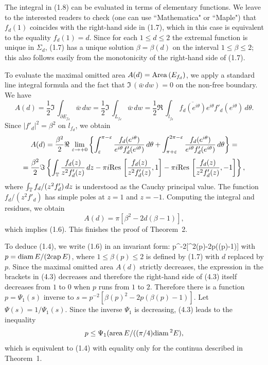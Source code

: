 The integral in (1.8) can be evaluated in terms of elementary functions. We leave to the interested readers to check (one can use ``Mathematica" or ``Maple")
that $f_d(1)$ coincides with the right-hand side in (1.7), which in this case is equivalent to the equality $f_d(1)=d$.
Since for each $1\le d\le 2$ the extremal function is unique in $\Sigma_d$, (1.7) has  a unique solution $\beta=\beta(d)$ on the interval $1\le \beta \le 2$;
this also follows easily from the monotonicity of the right-hand side of (1.7).


\medskip


To evaluate the maximal omitted area ${A(d)=\rm{Area}}\,(E_{f_d})$, we apply a standard line integral formula and
the fact that $\Im\, (\bar w\,dw)=0$ on the non-free boundary. We have
$$
A(d)=\frac12 \Im\,\int_{\partial E_{f_d}}\bar w\, dw=\frac12
\Im\,\int_{L_{f_d}}\bar w\,dw=\frac12 \Re\,\int_{l_{f_d}}
\overline{f_d(e^{i\theta})}e^{i\theta}f'_d(e^{i\theta})\,d\theta.
$$
Since $|f'_d|^2=\beta^2$ on $l_{f_d}$, we obtain 
$$
A(d)=\frac{\beta^2}{2}\Re\,\lim_{\varepsilon\to +0}\left\{\int_{\varepsilon}^{\pi-\varepsilon}
\frac{f_d(e^{i\theta})}{e^{i\theta}f'_d(e^{i\theta})}\,d\theta +\int_{\pi +\varepsilon}^{2\pi-\varepsilon}
\frac{f_d(e^{i\theta})}{e^{i\theta}f'_d(e^{i\theta})}\,d\theta\right\}=
$$
$$
=\frac{ \beta^2}{2} \Im\left\{ \int_{{\Bbb{T}}} \frac{f_d(z)}{z^2f'_d(z)}\,dz-\pi i {\rm{Res}}\,\left[\frac{f_d(z)}{z^2f'_d(z)},1\right]
-\pi i {\rm{Res}}\,\left[\frac{f_d(z)}{z^2f'_d(z)},-1\right]\right\},
$$
where $\int_{{\Bbb{T}}}f_d/(z^2f'_d) \,dz$ is understood as the Cauchy principal value. 
The function $f_d/(z^2f'_d)$ has simple poles at $z=1$ and $z=-1$.
Computing the integral and residues, we obtain 
$$
A(d)=\pi[\beta^2-2d(\beta-1)],
$$
which implies (1.6). This finishes the proof of Theorem~2.

\medskip

To deduce (1.4), we write (1.6) in an invariant form:
\be
{}\le p^{-2}[\beta^2(p)-2p(\beta(p)-1)]
\ee
with $p={\rm diam}\, E/(2{\rm cap}\, E)$, where $1\le \beta(p)\le 2$ is defined by  (1.7) with $d$ replaced by $p$.
Since the maximal omitted area $A(d)$ strictly decreases, the expression in the brackets in (4.3) decreases and therefore the right-hand side 
of (4.3) itself decreases from $1$ to $0$ when $p$ runs from $1$ to $2$. Therefore there is a function $p=\Psi_1(s)$ inverse to 
$s=p^{-2}[\beta(p)^2-2p(\beta(p)-1)]$. Let $\Psi(s)=1/\Psi_1(s)$.
Since the inverse $\Psi_1$ is decreasing, (4.3) leads to the inequality
$$
p\le \Psi_1({\rm area}\, E/((\pi/4){\rm diam}\,^2E),
$$
which is equivalent to (1.4) with equality only for the continua described in Theorem~1.



